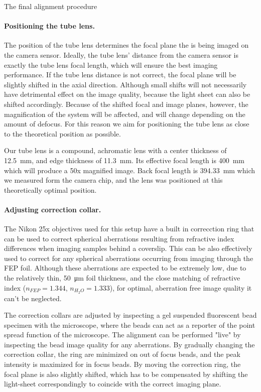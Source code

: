     The final alignment procedure 

    \paragraph{Positioning the tube lens.}
      The position of the tube lens determines the focal plane the is being imaged on the camera sensor. Ideally, the tube lens' distance from the camera sensor is exactly the tube lens focal length, which will ensure the best imaging performance. If the tube lens distance is not correct, the focal plane will be slightly shifted in the axial direction. Although small shifts will not necessarily have detrimental effect on the image quality, because the light sheet can also be shifted accordingly. Because of the shifted focal and image planes, however, the magnification of the system will be affected, and will change depending on the amount of defocus. For this reason we aim for positioning the tube lens as close to the theoretical position as possible.

      Our tube lens is a compound, achromatic lens with a center thickness of \SI{12.5}{mm}, and edge thickness of \SI{11.3}{mm}. Its effective focal length is \SI{400}{mm} which will produce a 50x magnified image. Back focal length is \SI{394.33}{mm} which we measured form the camera chip, and the lens was positioned at this theoretically optimal position.

    \paragraph{Adjusting correction collar.}
      The Nikon 25x objectives used for this setup have a built in correcction ring that can be used to correct spherical aberrations resulting from refractive index differences when imaging samples behind a coverslip. This can be also effectively used to correct for any spherical aberrations occurring from imaging through the FEP foil. Although these aberrations are expected to be extremely low, due to the relatively thin, \SI{50}{\micro m} foil thickness, and the close matching of refractive index ($n_{FEP} = 1.344$, $n_{H_2O}=1.333$), for optimal, aberration free image quality it can't be neglected.

      The correction collars are adjusted by inspecting a gel suspended fluorescent bead specimen with the microscope, where the beads can act as a reporter of the point spread function of the microscope. The alignment can be performed "live" by inspecting the bead image quality for any aberrations. By gradually changing the correction collar, the ring are minimized on out of focus beads, and the peak intensity is maximized for in focus beads. By moving the correction ring, the focal plane is also slightly shifted, which has to be compensated by shifting the light-sheet correspondingly to coincide with the correct imaging plane.

